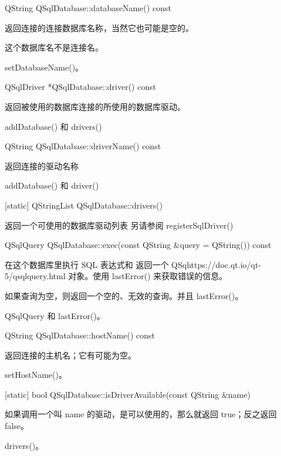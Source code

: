 QString QSqlDatabase::databaseName() const


返回连接的连接数据库名称，当然它也可能是空的。

\begin{notice}
这个数据库名不是连接名。
\end{notice}

\begin{notice}[另请参阅]
setDatabaseName()。
\end{notice}


QSqlDriver *QSqlDatabase::driver() const


返回被使用的数据库连接的所使用的数据库驱动。

\begin{notice}[另请参阅]
addDatabase() 和 drivers()
\end{notice}

QString QSqlDatabase::driverName() const

返回连接的驱动名称

\begin{notice}[另请参阅]
addDatabase() 和 driver()
\end{notice}

[static] QStringList QSqlDatabase::drivers()

返回一个可使用的数据库驱动列表 另请参阅 registerSqlDriver()

QSqlQuery QSqlDatabase::exec(const QString \&query = QString()) const


在这个数据库里执行 SQL 表达式和 返回一个 QSqhttps://doc.qt.io/qt-5/qsqlquery.html 对象。使用 lastError() 来获取错误的信息。

如果查询为空，则返回一个空的、无效的查询。并且 lastError()。

\begin{notice}[另请参阅]
QSqlQuery 和 lastError()。
\end{notice}


QString QSqlDatabase::hostName() const


返回连接的主机名；它有可能为空。

\begin{notice}[另请参阅]
 setHostName()。
\end{notice}


[static] bool QSqlDatabase::isDriverAvailable(const QString \&name)


如果调用一个叫 name 的驱动，是可以使用的，那么就返回 true；反之返回 false。

\begin{notice}[另请参阅]
drivers()。
\end{notice}


